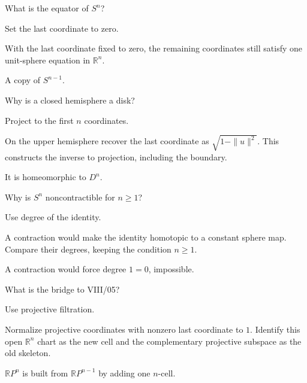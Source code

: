 \begin{exercise}\label{exr:viii04-21}
What is the equator of \(S^n\)?
\end{exercise}
\begin{hint}
Set the last coordinate to zero.

With the last coordinate fixed to zero, the remaining coordinates still satisfy one unit-sphere equation in \(\mathbb R^n\).
\end{hint}
\begin{solution}
A copy of \(S^{n-1}\).
\end{solution}

\begin{exercise}\label{exr:viii04-22}
Why is a closed hemisphere a disk?
\end{exercise}
\begin{hint}
Project to the first \(n\) coordinates.

On the upper hemisphere recover the last coordinate as \(\sqrt{1-\|u\|^2}\). This constructs the inverse to projection, including the boundary.
\end{hint}
\begin{solution}
It is homeomorphic to \(D^n\).
\end{solution}

\begin{exercise}\label{exr:viii04-23}
Why is \(S^n\) noncontractible for \(n\ge1\)?
\end{exercise}
\begin{hint}
Use degree of the identity.

A contraction would make the identity homotopic to a constant sphere map. Compare their degrees, keeping the condition \(n\ge1\).
\end{hint}
\begin{solution}
A contraction would force degree \(1=0\), impossible.
\end{solution}

\begin{exercise}\label{exr:viii04-24}
What is the bridge to VIII/05?
\end{exercise}
\begin{hint}
Use projective filtration.

Normalize projective coordinates with nonzero last coordinate to \(1\). Identify this open \(\mathbb R^n\) chart as the new cell and the complementary projective subspace as the old skeleton.
\end{hint}
\begin{solution}
\(\mathbb RP^n\) is built from \(\mathbb RP^{n-1}\) by adding one \(n\)-cell.
\end{solution}


